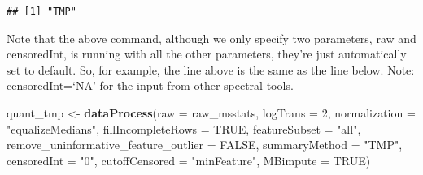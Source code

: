 \documentclass[]{book}
\newenvironment{Shaded}{\begin{snugshade}}{\end{snugshade}}
\newcommand{\DataTypeTok}[1]{\textcolor[rgb]{0.13,0.29,0.53}{#1}}
\newcommand{\DecValTok}[1]{\textcolor[rgb]{0.00,0.00,0.81}{#1}}
\newcommand{\KeywordTok}[1]{\textcolor[rgb]{0.13,0.29,0.53}{\textbf{#1}}}
\newcommand{\NormalTok}[1]{#1}
\newcommand{\OtherTok}[1]{\textcolor[rgb]{0.56,0.35,0.01}{#1}}
\newcommand{\StringTok}[1]{\textcolor[rgb]{0.31,0.60,0.02}{#1}}
\begin{document}
\begin{verbatim}
## [1] "TMP"
\end{verbatim}

Note that the above command, although we only specify two parameters, raw and censoredInt, is running with all the other parameters, they're just automatically set to default. So, for example, the line above is the same as the line below. Note: censoredInt=`NA' for the input from other spectral tools.

\begin{Shaded}
\begin{Highlighting}[]
\NormalTok{quant_tmp <-}\StringTok{ }\KeywordTok{dataProcess}\NormalTok{(}\DataTypeTok{raw =}\NormalTok{ raw_msstats, }
                        \DataTypeTok{logTrans =} \DecValTok{2}\NormalTok{, }
                        \DataTypeTok{normalization =} \StringTok{"equalizeMedians"}\NormalTok{, }
                        \DataTypeTok{fillIncompleteRows =} \OtherTok{TRUE}\NormalTok{, }
                        \DataTypeTok{featureSubset =} \StringTok{"all"}\NormalTok{, }
                        \DataTypeTok{remove_uninformative_feature_outlier =} \OtherTok{FALSE}\NormalTok{, }
                        \DataTypeTok{summaryMethod =} \StringTok{"TMP"}\NormalTok{, }
                        \DataTypeTok{censoredInt =} \StringTok{"0"}\NormalTok{, }
                        \DataTypeTok{cutoffCensored =} \StringTok{"minFeature"}\NormalTok{, }
                        \DataTypeTok{MBimpute =} \OtherTok{TRUE}\NormalTok{)}
\end{Highlighting}
\end{Shaded}
\end{document}
